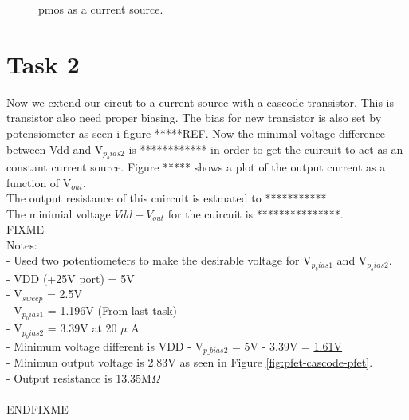 \documentclass[a4paper,english,11pt]{article}
\begin{document}
\begin{figure}[htbp]
 \centering
  \caption{pmos as a current source.}
  \label{fig:pmos-as-current-source}	
\end{figure}

\newpage
\section{Task 2}
Now we extend our circut to a current source with a cascode transistor. This is transistor also need proper biasing. The bias for new transistor is also set by potensiometer as seen i figure *****REF.
Now the minimal voltage difference between Vdd and V$_{p_bias2}$ is ************ in order to get the cuircuit to act as an constant current source.
Figure ***** shows a plot of the \colorbox{blue!30}{output current} as a function of V$_{out}$. \\
The output resistance of this cuircuit is estmated to ***********.\\
The minimial voltage $Vdd - V_{out}$ for the cuircuit is ***************.\\


\colorbox{red!30}{FIXME}\\
Notes:\\
- Used two potentiometers to make the desirable voltage for V$_{p_bias1}$ and V$_{p_bias2}$.\\
- VDD (+25V port) = 5V\\
- V$_{sweep}$ = 2.5V\\
- V$_{p_bias1}$ = 1.196V (From last task)\\
- V$_{p_bias2}$ = 3.39V at 20 $\mu$ A\\
- Minimum voltage different is VDD - V$_{p\_bias2}$ = 5V - 3.39V = \underline{\underline{1.61V}}\\
- Minimun output voltage is 2.83V as seen in Figure \ref{fig:pfet-cascode-pfet}.\\
- Output resistance is 13.35M$\Omega$\\
\\
\colorbox{red!30}{ENDFIXME}\\
\end{document}
